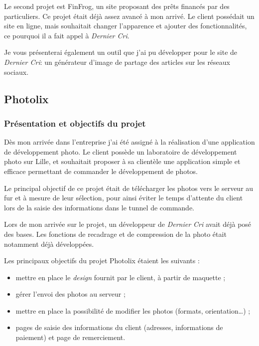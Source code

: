 \bigskip

Le second projet est FinFrog, un site proposant des prêts financés par
des particuliers. Ce projet était déjà assez avancé à mon arrivé. Le
client possédait un site en ligne, mais souhaitait changer l'apparence
et ajouter des fonctionnalités, ce pourquoi il a fait appel à
\emph{Dernier Cri}.

\bigskip

Je vous présenterai également un outil que j'ai pu développer pour le
site de \emph{Dernier Cri}: un générateur d'image de partage des
articles sur les réseaux sociaux.

\bigskip

\subsection{Photolix}\label{photolix}

\subsubsection{Présentation et objectifs du
projet}\label{pruxe9sentation-et-objectifs-du-projet}

\bigskip

Dès mon arrivée dans l'entreprise j'ai été assigné à la réalisation
d'une application de développement photo. Le client possède un
laboratoire de développement photo sur Lille, et souhaitait proposer à
sa clientèle une application simple et efficace permettant de commander
le développement de photos.

\bigskip

Le principal objectif de ce projet était de télécharger les photos vers
le serveur au fur et à mesure de leur sélection, pour ainsi éviter le
temps d'attente du client lors de la saisie des informations dans le
tunnel de commande.

\bigskip

Lors de mon arrivée sur le projet, un développeur de \emph{Dernier Cri}
avait déjà posé des bases. Les fonctions de recadrage et de compression
de la photo était notamment déjà développées.

\bigskip

Les principaux objectifs du projet Photolix étaient les suivants :

\begin{itemize}
\tightlist
\item
  mettre en place le \emph{design} fournit par le client, à partir de
  maquette ;
\item
  gérer l'envoi des photos au serveur ;
\item
  mettre en place la possibilité de modifier les photos (formats,
  orientation\ldots{}) ;
\item
  pages de saisie des informations du client (adresses, informations de
  paiement) et page de remerciement.
\end{itemize}

